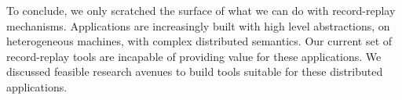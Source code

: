 To conclude, we only scratched the surface of what we can do with record-replay
mechanisms. Applications are increasingly built with high level abstractions, on
heterogeneous machines, with complex distributed semantics. Our current set of
record-replay tools are incapable of providing value for these applications. We
discussed feasible research avenues to build tools suitable for these
distributed applications.
